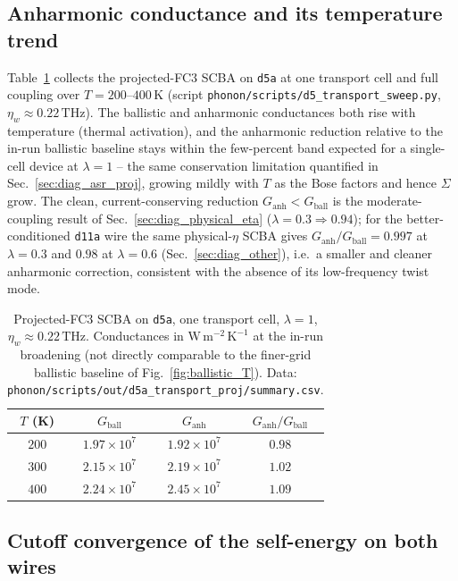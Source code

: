 \subsection{Anharmonic conductance and its temperature trend}
\label{sec:diag_anh_sweep}

Table~\ref{tab:anh_T} collects the projected-FC3 SCBA on \texttt{d5a} at one transport
cell and full coupling over $T=200$--$400\,\mathrm{K}$ (script
\texttt{phonon/scripts/d5\_transport\_sweep.py}, $\eta_w\!\approx\!0.22\,\mathrm{THz}$).
The ballistic and anharmonic conductances both rise with temperature (thermal activation),
and the anharmonic reduction relative to the in-run ballistic baseline stays within the
few-percent band expected for a single-cell device at $\lambda=1$ -- the same conservation
limitation quantified in Sec.~\ref{sec:diag_asr_proj}, growing mildly with $T$ as the Bose
factors and hence $\Sigma$ grow. The clean, current-conserving reduction
$G_\mathrm{anh}<G_\mathrm{ball}$ is the moderate-coupling result of
Sec.~\ref{sec:diag_physical_eta} ($\lambda=0.3\Rightarrow0.94$); for the better-conditioned
\texttt{d11a} wire the same physical-$\eta$ SCBA gives $G_\mathrm{anh}/G_\mathrm{ball}=0.997$
at $\lambda=0.3$ and $0.98$ at $\lambda=0.6$ (Sec.~\ref{sec:diag_other}), i.e.\ a smaller and
cleaner anharmonic correction, consistent with the absence of its low-frequency twist mode.

\begin{table}[htb]
  \centering
  \caption{Projected-FC3 SCBA on \texttt{d5a}, one transport cell, $\lambda=1$,
  $\eta_w\!\approx\!0.22\,\mathrm{THz}$. Conductances in
  $\mathrm{W\,m^{-2}\,K^{-1}}$ at the in-run broadening (not directly comparable to the
  finer-grid ballistic baseline of Fig.~\ref{fig:ballistic_T}). Data:
  \texttt{phonon/scripts/out/d5a\_transport\_proj/summary.csv}.}
  \label{tab:anh_T}
  \begin{tabular}{cccc}
    \toprule
    $T$ (K) & $G_\mathrm{ball}$ & $G_\mathrm{anh}$ & $G_\mathrm{anh}/G_\mathrm{ball}$ \\
    \midrule
    $200$ & $1.97\times10^{7}$ & $1.92\times10^{7}$ & $0.98$ \\
    $300$ & $2.15\times10^{7}$ & $2.19\times10^{7}$ & $1.02$ \\
    $400$ & $2.24\times10^{7}$ & $2.45\times10^{7}$ & $1.09$ \\
    \bottomrule
  \end{tabular}
\end{table}

\subsection{Cutoff convergence of the self-energy on both wires}
\label{sec:diag_cutoff_sweep}

